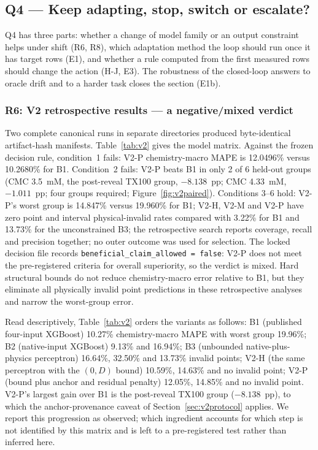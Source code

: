 \documentclass[11pt,a4paper]{article}
\newcommand{\tox}{TX100}
\begin{document}
\subsection{Q4 --- Keep adapting, stop, switch or escalate?}
\label{sec:q4}
Q4 has three parts: whether a change of model family or an output constraint
helps under shift (R6, R8), which adaptation method the loop should run once it
has target rows (E1), and whether a rule computed from the first measured rows
should change the action (H-J, E3). The robustness of the closed-loop answers
to oracle drift and to a harder task closes the section (E1b).

\subsubsection{R6: V2 retrospective results --- a negative/mixed verdict}
\label{sec:r6}
Two complete canonical runs in separate directories produced byte-identical
artifact-hash manifests. Table~\ref{tab:v2} gives the model matrix. Against
the frozen decision rule, condition~1 fails: V2-P chemistry-macro MAPE is
12.0496\% versus 10.2680\% for B1. Condition~2 fails: V2-P beats B1 in only
2 of 6 held-out groups (CMC 3.5~mM, the post-reveal \tox{} group,
$-8.138$~pp; CMC 4.33~mM, $-1.011$~pp; four groups required;
Figure~\ref{fig:v2paired}). Conditions 3--6 hold: V2-P's worst group is
14.847\% versus 19.960\% for B1; V2-H, V2-M and V2-P have zero point and
interval physical-invalid rates compared with 3.22\% for B1 and 13.73\% for the
unconstrained B3; the retrospective search reports coverage, recall and
precision together; no outer outcome was used for selection. The locked decision file
records \texttt{beneficial\_claim\_allowed = false}: V2-P does not meet the
pre-registered criteria for overall superiority, so the verdict is mixed.
Hard structural bounds do not reduce chemistry-macro error relative to B1,
but they eliminate all physically invalid point predictions in these
retrospective analyses and narrow the worst-group error.

Read descriptively, Table~\ref{tab:v2} orders the variants as follows: B1
(published four-input XGBoost) 10.27\% chemistry-macro MAPE with worst group
19.96\%; B2 (native-input XGBoost) 9.13\% and 16.94\%; B3 (unbounded
native-plus-physics perceptron) 16.64\%, 32.50\% and 13.73\% invalid
points; V2-H (the same perceptron with the $(0,D)$ bound) 10.59\%, 14.63\%
and no invalid point; V2-P (bound plus anchor and residual penalty) 12.05\%,
14.85\% and no invalid point. V2-P's largest gain over B1 is the post-reveal
\tox{} group ($-8.138$~pp), to which the anchor-provenance caveat of
Section~\ref{sec:v2protocol} applies. We report this progression as
observed; which ingredient accounts for which step is not identified by this
matrix and is left to a pre-registered test rather than inferred here.
\end{document}
